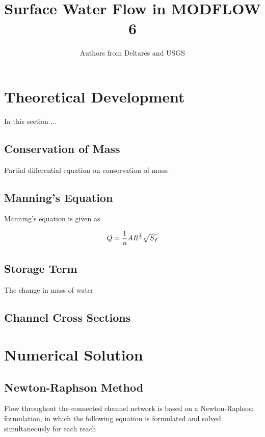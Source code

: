 \documentclass[fleqn]{article}
\author{Authors from Deltares and USGS}
\begin{document}
\title{Surface Water Flow in MODFLOW 6}
\maketitle

\tableofcontents

\section{Theoretical Development}
In this section ...

\subsection{Conservation of Mass}
Partial differential equation on conservation of mass:

\subsection{Manning's Equation}
Manning's equation is given as

\begin{equation}
  Q = \frac{1}{n} A R^{2 \over 3} \sqrt{S_f}
\end{equation}

\subsection{Storage Term}
The change in mass of water 

\subsection{Channel Cross Sections}

\section{Numerical Solution}

\subsection{Newton-Raphson Method}

Flow throughout the connected channel network is based on a Newton-Raphson formulation, in which the following equation is formulated and solved simultaneously for each reach
\end{document}
